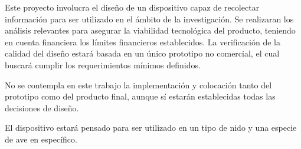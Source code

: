 Este proyecto involucra el diseño de un dispositivo capaz de recolectar información para ser utilizado en el ámbito de la investigación. Se realizaran los análisis relevantes para asegurar la viabilidad tecnológica del producto, teniendo en cuenta financiera los límites financieros establecidos. La verificación de la calidad del diseño estará basada en un único prototipo no comercial, el cual buscará cumplir los requerimientos mínimos definidos. 

No se contempla en este trabajo la implementación y colocación tanto del prototipo como del producto final, aunque sí estarán establecidas todas las decisiones de diseño. 

El dispositivo estará pensado para ser utilizado en un tipo de nido y una especie de ave en específico.